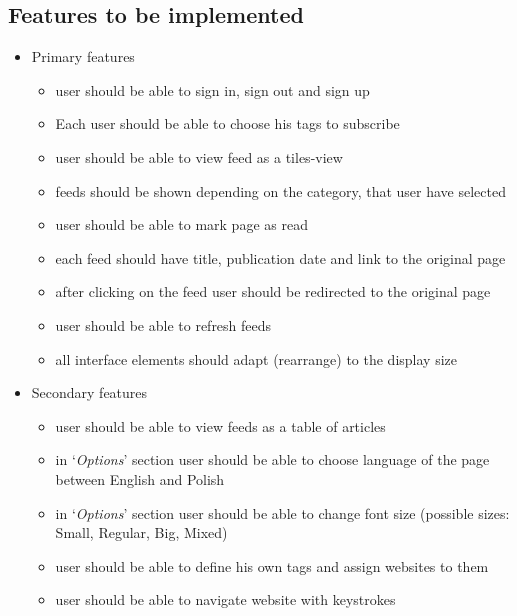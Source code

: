 \documentclass[12pt]{article}
\begin{document}
\subsection{Features to be implemented}

\begin{itemize}
	\item Primary features
	\begin{itemize}
		\item user should be able to sign in, sign out and sign up
		\item Each user should be able to choose his tags to subscribe
		\item user should be able to view feed as a tiles-view
		\item feeds should be shown depending on the category, that user have selected
		\item user should be able to mark page as read
		\item each feed should have title, publication date and link to the original page
		\item after clicking on the feed user should be redirected to the original page
		\item user should be able to refresh feeds
		\item all interface elements should adapt (rearrange) to the display size
	\end{itemize}

	\item Secondary features
	\begin{itemize}
			\item user should be able to view feeds as a table of articles
			\item in `\emph{Options}' section user should be able to choose language of the page between English and Polish
			\item in `\emph{Options}' section user should be able to change font size (possible sizes:  Small, Regular, Big, Mixed)
			\item user should be able to define his own tags and assign websites to them
			\item user should be able to navigate website with keystrokes
	\end{itemize}
\end{itemize}

\end{document}
